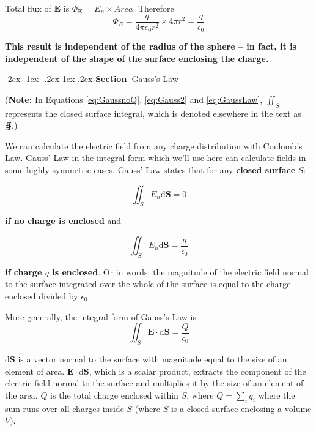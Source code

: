 \documentclass[
]{book}
\makeatletter
\renewcommand\section{%
\@startsection{section}{1}{\z@}%
              {-2ex \@plus -1ex \@minus -.2ex}%
              {1ex \@plus .2ex}%
              {\sffamily\bfseries\large\noindent Section~}}
\makeatother
\begin{document}
Total flux of \(\mathbf{E}\) is \(\Phi_{\mathbf{E}} = E_n \times Area\). Therefore
\begin{equation}
\label{eq:fluxE}
\Phi_E = \frac{q}{4\pi\epsilon_0 r^2} \times 4\pi r^2 = \frac{q}{\epsilon_0} 
\end{equation}

\textbf{This result is independent of the radius of the sphere -- in fact, it
is independent of the shape of the surface enclosing the charge.}

\hypertarget{gausss-law}{%
\section{Gauss's Law}\label{gausss-law}}

(\textbf{Note:} In Equations \eqref{eq:GaussnoQ}, \eqref{eq:Gauss2} and \eqref{eq:GaussLaw}, \(\iint_S\) represents the closed surface integral, which is denoted elsewhere in the text as ∯.)

We can calculate the electric field from any charge distribution with
Coulomb's Law. Gauss' Law in the integral form which we'll use here can
calculate fields in some highly symmetric cases. Gauss' Law states that
for any \textbf{closed surface} \(S\):

\begin{equation}
\label{eq:GaussnoQ}
\iint_S{E_n} \mathrm{d} \mathbf{S} = 0
\end{equation}

\textbf{if no charge is enclosed} and

\begin{equation}
\label{eq:Gauss2}
\iint_S{E_n} \mathrm{d} \mathbf{S} = \frac{q}{\epsilon_0}
\end{equation}

\textbf{if charge \(q\) is enclosed}. Or in words: the magnitude of the electric field normal to the surface
integrated over the whole of the surface is equal to the charge enclosed
divided by \(\epsilon_0\).

More generally, the integral form of Gauss's Law is
\begin{equation}
\label{eq:GaussLaw} 
\iint_S \mathbf{E} \cdot \mathrm{d} \mathbf{S} =\frac{Q}{\epsilon_0}
\end{equation}

\(\mathrm{d} \mathbf{S}\) is a vector normal to the surface with magnitude equal to the
size of an element of area. \(\mathbf{E} \cdot \mathrm{d} \mathbf{S}\), which is a scalar product,
extracts the component of the electric field normal to the surface and
multiplies it by the size of an element of the area. \(Q\) is the total
charge enclosed within \(S\), where \(Q = \sum_i q_i\) where the sum runs
over all charges inside \(S\) (where \(S\) is a closed surface enclosing a
volume \(V\)).
\end{document}
